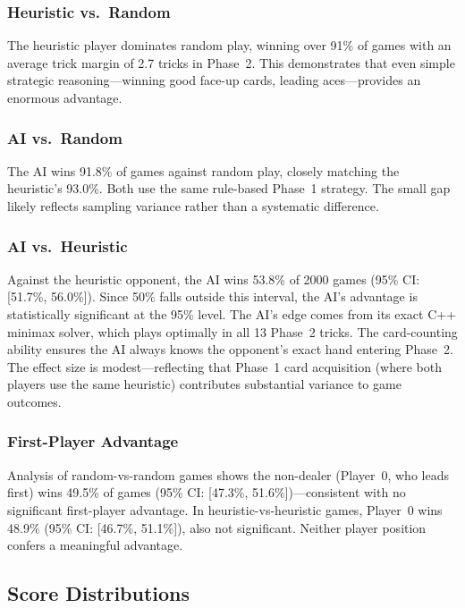 \subsubsection{Heuristic vs.\ Random}

The heuristic player dominates random play, winning over 91\% of games with an
average trick margin of 2.7 tricks in Phase~2. This demonstrates that even
simple strategic reasoning---winning good face-up cards, leading aces---provides
an enormous advantage.

\subsubsection{AI vs.\ Random}

The AI wins 91.8\% of games against random play, closely matching the
heuristic's 93.0\%. Both use the same rule-based Phase~1 strategy. The small
gap likely reflects sampling variance rather than a systematic difference.

\subsubsection{AI vs.\ Heuristic}

Against the heuristic opponent, the AI wins 53.8\% of 2000 games (95\% CI:
[51.7\%, 56.0\%]). Since 50\% falls outside this interval, the AI's advantage
is statistically significant at the 95\% level. The AI's edge comes from its
exact C++ minimax solver, which plays optimally in all 13 Phase~2 tricks. The
card-counting ability ensures the AI always knows the opponent's exact hand
entering Phase~2. The effect size is modest---reflecting that Phase~1 card
acquisition (where both players use the same heuristic) contributes
substantial variance to game outcomes.

\subsubsection{First-Player Advantage}

Analysis of random-vs-random games shows the non-dealer (Player~0, who leads
first) wins 49.5\% of games (95\% CI: [47.3\%, 51.6\%])---consistent with no
significant first-player advantage. In heuristic-vs-heuristic games, Player~0
wins 48.9\% (95\% CI: [46.7\%, 51.1\%]), also not significant. Neither player
position confers a meaningful advantage.

\subsection{Score Distributions}


